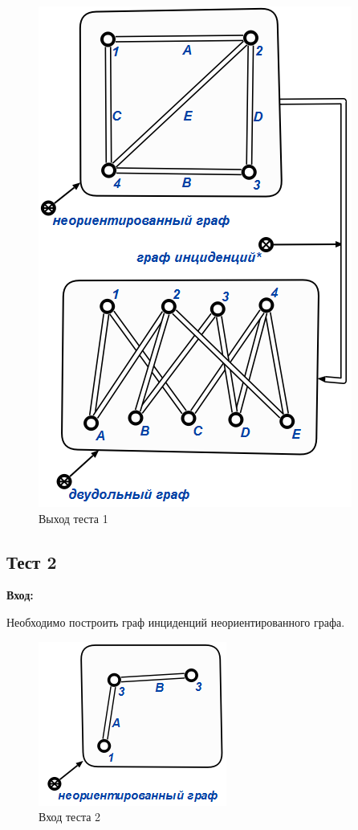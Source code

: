 \begin{figure}[H]
  \centering
  \includegraphics[scale=0.7]{images/14.png}
  \caption{Выход теста 1}
\end{figure}

\subsection{Тест 2}

\textbf{Вход:}

Необходимо построить граф инциденций неориентированного графа.

\begin{figure}[H]
  \centering
  \includegraphics[scale=0.7]{images/15.png}
  \caption{Вход теста 2}
\end{figure}

